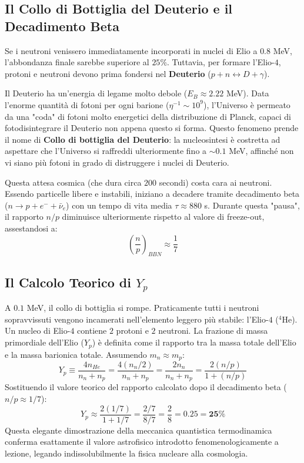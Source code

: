 \documentclass[11pt,a4paper]{report}
\begin{document}
\subsection{Il Collo di Bottiglia del Deuterio e il Decadimento Beta}
Se i neutroni venissero immediatamente incorporati in nuclei di Elio a $0.8$ MeV, l'abbondanza finale sarebbe superiore al $25\%$. Tuttavia, per formare l'Elio-$4$, protoni e neutroni devono prima fondersi nel \textbf{Deuterio} ($p + n \leftrightarrow D + \gamma$). 

Il Deuterio ha un'energia di legame molto debole ($E_B \approx 2.22$ MeV). Data l'enorme quantità di fotoni per ogni barione ($\eta^{-1} \sim 10^9$), l'Universo è permeato da una "coda" di fotoni molto energetici della distribuzione di Planck, capaci di fotodisintegrare il Deuterio non appena questo si forma. Questo fenomeno prende il nome di \textbf{Collo di bottiglia del Deuterio}: la nucleosintesi è costretta ad aspettare che l'Universo si raffreddi ulteriormente fino a $\sim 0.1$ MeV, affinché non vi siano più fotoni in grado di distruggere i nuclei di Deuterio.

Questa attesa cosmica (che dura circa $200$ secondi) costa cara ai neutroni. Essendo particelle libere e instabili, iniziano a decadere tramite decadimento beta ($n \to p + e^- + \bar{\nu}_e$) con un tempo di vita media $\tau \approx 880$ s. Durante questa "pausa", il rapporto $n/p$ diminuisce ulteriormente rispetto al valore di freeze-out, assestandosi a:
\begin{equation}
\left( \frac{n}{p} \right)_{BBN} \approx \frac{1}{7}
\end{equation}

\subsection{Il Calcolo Teorico di $Y_p$}
A $0.1$ MeV, il collo di bottiglia si rompe. Praticamente tutti i neutroni sopravvissuti vengono incamerati nell'elemento leggero più stabile: l'Elio-$4$ ($^4$He). Un nucleo di Elio-$4$ contiene $2$ protoni e $2$ neutroni. 
La frazione di massa primordiale dell'Elio ($Y_p$) è definita come il rapporto tra la massa totale dell'Elio e la massa barionica totale. Assumendo $m_n \approx m_p$:
\begin{equation}
Y_p \equiv \frac{4 n_{He}}{n_n + n_p} = \frac{4 (n_n / 2)}{n_n + n_p} = \frac{2 n_n}{n_n + n_p} = \frac{2 (n/p)}{1 + (n/p)}
\end{equation}
Sostituendo il valore teorico del rapporto calcolato dopo il decadimento beta ($n/p \approx 1/7$):
\begin{equation}
Y_p \approx \frac{2 (1/7)}{1 + 1/7} = \frac{2/7}{8/7} = \frac{2}{8} = 0.25 = \mathbf{25\%}
\end{equation}
Questa elegante dimostrazione della meccanica quantistica termodinamica conferma esattamente il valore astrofisico introdotto fenomenologicamente a lezione, legando indissolubilmente la fisica nucleare alla cosmologia.
\end{document}
